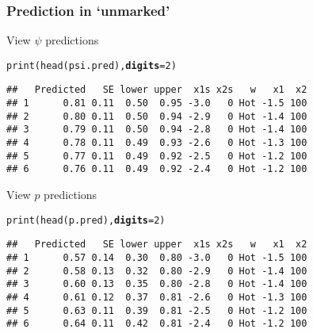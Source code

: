 \documentclass[color=usenames,dvipsnames]{beamer}\usepackage[]{graphicx}\usepackage[]{xcolor}
\makeatletter
\newcommand{\hlnum}[1]{\textcolor[rgb]{0.69,0.494,0}{#1}}%
\newcommand{\hldef}[1]{\textcolor[rgb]{0,0,0}{#1}}%
\newcommand{\hlkwc}[1]{\textcolor[rgb]{0,0,0}{\textbf{#1}}}%
\newcommand{\hlkwd}[1]{\textcolor[rgb]{0.004,0.004,0.506}{#1}}%
\newenvironment{kframe}{%
 \def\at@end@of@kframe{}%
 \ifinner\ifhmode%
  \def\at@end@of@kframe{\end{minipage}}%
  \begin{minipage}{\columnwidth}%
 \fi\fi%
 \def\FrameCommand##1{\hskip\@totalleftmargin \hskip-\fboxsep
 \colorbox{shadecolor}{##1}\hskip-\fboxsep
     \hskip-\linewidth \hskip-\@totalleftmargin \hskip\columnwidth}%
 \MakeFramed {\advance\hsize-\width
   \@totalleftmargin\z@ \linewidth\hsize
   \@setminipage}}%
 {\par\unskip\endMakeFramed%
 \at@end@of@kframe}
\newenvironment{knitrout}{}{} %
\makeatother
\begin{document}
\begin{frame}[fragile]
  \frametitle{Prediction in `unmarked'}
  \small
  View $\psi$ predictions
\begin{knitrout}\footnotesize
{}\color{fgcolor}\begin{kframe}
\begin{alltt}
\hlkwd{print}\hldef{(}\hlkwd{head}\hldef{(psi.pred),} \hlkwc{digits}\hldef{=}\hlnum{2}\hldef{)}
\end{alltt}
\begin{verbatim}
##   Predicted   SE lower upper  x1s x2s   w   x1  x2
## 1      0.81 0.11  0.50  0.95 -3.0   0 Hot -1.5 100
## 2      0.80 0.11  0.50  0.94 -2.9   0 Hot -1.4 100
## 3      0.79 0.11  0.50  0.94 -2.8   0 Hot -1.4 100
## 4      0.78 0.11  0.49  0.93 -2.6   0 Hot -1.3 100
## 5      0.77 0.11  0.49  0.92 -2.5   0 Hot -1.2 100
## 6      0.76 0.11  0.49  0.92 -2.4   0 Hot -1.2 100
\end{verbatim}
\end{kframe}
\end{knitrout}
\pause
\vfill
  View $p$ predictions
\begin{knitrout}\footnotesize
{}\color{fgcolor}\begin{kframe}
\begin{alltt}
\hlkwd{print}\hldef{(}\hlkwd{head}\hldef{(p.pred),} \hlkwc{digits}\hldef{=}\hlnum{2}\hldef{)}
\end{alltt}
\begin{verbatim}
##   Predicted   SE lower upper  x1s x2s   w   x1  x2
## 1      0.57 0.14  0.30  0.80 -3.0   0 Hot -1.5 100
## 2      0.58 0.13  0.32  0.80 -2.9   0 Hot -1.4 100
## 3      0.60 0.13  0.35  0.80 -2.8   0 Hot -1.4 100
## 4      0.61 0.12  0.37  0.81 -2.6   0 Hot -1.3 100
## 5      0.63 0.11  0.39  0.81 -2.5   0 Hot -1.2 100
## 6      0.64 0.11  0.42  0.81 -2.4   0 Hot -1.2 100
\end{verbatim}
\end{kframe}
\end{knitrout}
\end{frame}
\end{document}
